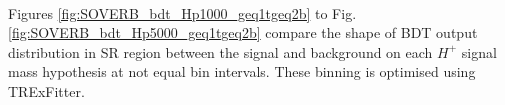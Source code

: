 \begin{figure}[H]
{    \label{fig:SOVERB_bdt_Hp4000_equivBinning_geq1tgeq2b}
  }\\
\end{figure}  

Figures \ref{fig:SOVERB_bdt_Hp1000_geq1tgeq2b} to Fig.\ref{fig:SOVERB_bdt_Hp5000_geq1tgeq2b} compare the shape of BDT output distribution in SR region between the signal and background on each  $H^{+}$ signal mass hypothesis at not equal bin intervals. These binning is optimised using TRExFitter.

